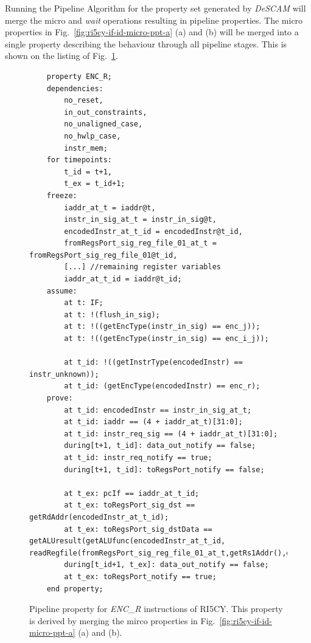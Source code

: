 Running the Pipeline Algorithm for the property set generated by \textit{DeSCAM} will merge the micro and \textit{wait} operations resulting in pipeline properties. The micro properties in Fig.~\ref{fig:ri5cy-if-id-micro-ppt-a} (a) and (b) will be merged into a single property describing the behaviour through all pipeline stages. This is shown on the listing of Fig.~\ref{fig:ri5cy-enc-r-ppt}.

\begin{figure}[htb!]
    \begin{lstlisting}
    property ENC_R;
    dependencies: 
        no_reset,
        in_out_constraints,
        no_unaligned_case,
        no_hwlp_case,
        instr_mem;
    for timepoints:
        t_id = t+1,
        t_ex = t_id+1;
    freeze:
        iaddr_at_t = iaddr@t,
        instr_in_sig_at_t = instr_in_sig@t,
        encodedInstr_at_t_id = encodedInstr@t_id,
        fromRegsPort_sig_reg_file_01_at_t = fromRegsPort_sig_reg_file_01@t_id,
        [...] //remaining register variables
        iaddr_at_t_id = iaddr@t_id;
    assume:
        at t: IF;
        at t: !(flush_in_sig);
        at t: !((getEncType(instr_in_sig) == enc_j));
        at t: !((getEncType(instr_in_sig) == enc_i_j));
        
        at t_id: !((getInstrType(encodedInstr) == instr_unknown));
        at t_id: (getEncType(encodedInstr) == enc_r);
    prove:
        at t_id: encodedInstr == instr_in_sig_at_t;
        at t_id: iaddr == (4 + iaddr_at_t)[31:0];
        at t_id: instr_req_sig == (4 + iaddr_at_t)[31:0];
        during[t+1, t_id]: data_out_notify == false;
        at t_id: instr_req_notify == true;
        during[t+1, t_id]: toRegsPort_notify == false;
        
        at t_ex: pcIf == iaddr_at_t_id;
        at t_ex: toRegsPort_sig_dst == getRdAddr(encodedInstr_at_t_id);
        at t_ex: toRegsPort_sig_dstData == getALUresult(getALUfunc(encodedInstr_at_t_id, readRegfile(fromRegsPort_sig_reg_file_01_at_t,getRs1Addr(),getRs2Addr()));
        during[t_id+1, t_ex]: data_out_notify == false;
        at t_ex: toRegsPort_notify == true;
    end property;\end{lstlisting}
    \caption{Pipeline property for \textit{ENC\_R} instructions of RI5CY. This property is derived by merging the mirco properties in Fig.~\ref{fig:ri5cy-if-id-micro-ppt-a} (a) and (b).}
    \label{fig:ri5cy-enc-r-ppt}
\end{figure}

